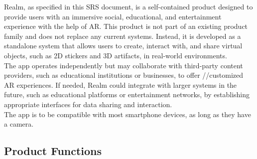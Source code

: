\documentclass{article}
\begin{document}
Realm, as specified in this SRS document, is a self-contained product designed to provide users with an immersive social, educational, and entertainment experience with the help of AR. This product is not part of an existing product family and does not replace any current systems. Instead, it is developed as a standalone system that allows users to create, interact with, and share virtual objects, such as 2D stickers and 3D artifacts, in real-world environments.\\

The app operates independently but may collaborate with third-party content providers, such as educational institutions or businesses, to offer //customized AR experiences. If needed, Realm could integrate with larger systems in the future, such as educational platforms or entertainment networks, by establishing appropriate interfaces for data sharing and interaction.\\

The app is to be compatible with most smartphone devices, as long as they have a camera.


\subsection{Product Functions}
\end{document}
